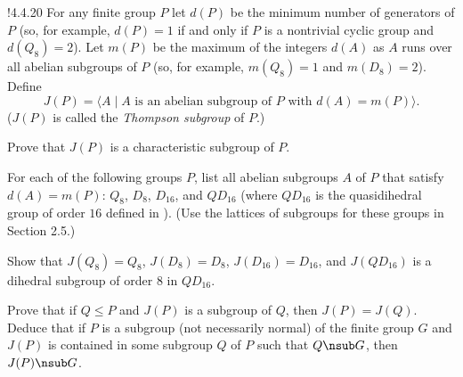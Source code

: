 \begin{exercise}!{4.4.20}
	For any finite group $P$ let $d(P)$ be the minimum number of generators of $P$ (so, for example, $d(P)=1$ if and only if $P$ is a nontrivial cyclic group and $d(Q_8)=2$).
	Let $m(P)$ be the maximum of the integers $d(A)$ as $A$ runs over all abelian subgroups of $P$ (so, for example, $m(Q_8)=1$ and $m(D_8)=2$).
	Define
	\[
		J(P)=\langle A \mid A \text{ is an abelian subgroup of } P \text{ with } d(A)=m(P)\rangle.
	\]
	($J(P)$ is called the \emph{Thompson subgroup} of $P$.)
	\begin{subexercises}
		\item Prove that $J(P)$ is a characteristic subgroup of $P$.
		\item For each of the following groups $P$, list all abelian subgroups $A$ of $P$ that satisfy $d(A)=m(P)$: $Q_8$, $D_8$, $D_{16}$, and $QD_{16}$ (where $QD_{16}$ is the quasidihedral group of order $16$ defined in ). (Use the lattices of subgroups for these groups in Section 2.5.)
		\item Show that $J(Q_8)=Q_8$, $J(D_8)=D_8$, $J(D_{16})=D_{16}$, and $J(QD_{16})$ is a dihedral subgroup of order $8$ in $QD_{16}$.
		\item Prove that if $Q\leq P$ and $J(P)$ is a subgroup of $Q$, then $J(P)=J(Q)$.
		Deduce that if $P$ is a subgroup (not necessarily normal) of the finite group $G$ and $J(P)$ is contained in some subgroup $Q$ of $P$ such that $Q \nsub G$, then $J(P) \nsub G$.
	\end{subexercises}
\end{exercise}

